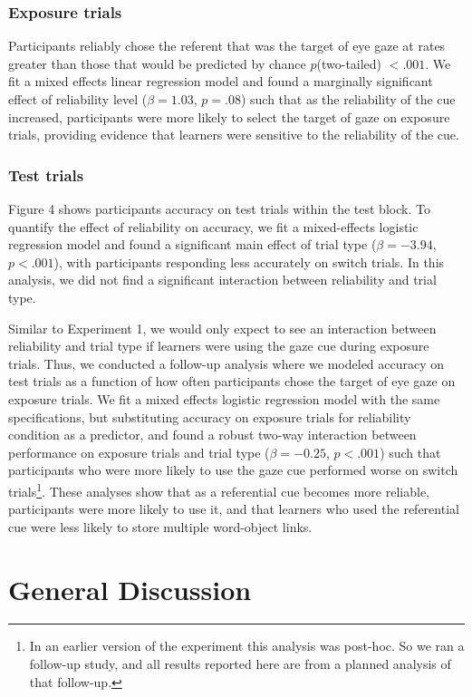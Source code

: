 \documentclass[10pt,letterpaper]{article}
\begin{document}
\subsubsection{Exposure trials}
Participants reliably chose the referent that was the target of eye gaze at rates greater than those that would be predicted by chance $p$(two-tailed) $< .001$. We fit a mixed effects linear regression model and found a marginally significant effect of reliability level ($\beta= 1.03$, $p=.08$) such that as the reliability of the cue increased, participants were more likely to select the target of gaze on exposure trials, providing evidence that learners were sensitive to the reliability of the cue. 

\subsubsection{Test trials}
Figure 4 shows participants accuracy on test trials within the test block.  To quantify the effect of reliability on accuracy, we fit a mixed-effects logistic regression model and found a significant main effect of trial type ($\beta= -3.94$, $p<.001$), with participants responding less accurately on switch trials. In this analysis, we did not find a significant interaction between reliability and trial type. 

Similar to Experiment 1, we would only expect to see an interaction between reliability and trial type if learners were using the gaze cue during exposure trials. Thus, we conducted a follow-up analysis where we modeled accuracy on test trials as a function of how often participants chose the target of eye gaze on exposure trials. We fit a mixed effects logistic regression model with the same specifications, but substituting accuracy on exposure trials for reliability condition as a predictor, and found a robust two-way interaction between performance on exposure trials and trial type ($\beta= -0.25$, $p<.001$) such that participants who were more likely to use the gaze cue performed worse on switch trials\footnote{In an earlier version of the experiment this analysis was post-hoc. So we ran a follow-up study, and all results reported here are from a planned analysis of that follow-up.}. These analyses show that as a referential cue becomes more reliable, participants were more likely to use it, and that learners who used the referential cue were less likely to store multiple word-object links.

\section{General Discussion}
\end{document}
